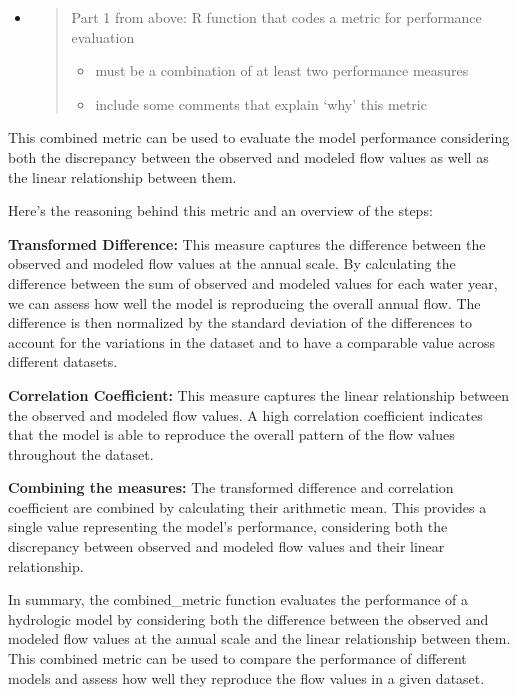 \documentclass[
  letterpaper,
  DIV=11,
  numbers=noendperiod]{scrartcl}
\begin{document}
\begin{itemize}
\item
  \begin{quote}
  Part 1 from above: R function that codes a metric for performance
  evaluation

  \begin{itemize}
  \item
    must be a combination of at least two performance measures
  \item
    include some comments that explain `why' this metric
  \end{itemize}
  \end{quote}
\end{itemize}

This combined metric can be used to evaluate the model performance
considering both the discrepancy between the observed and modeled flow
values as well as the linear relationship between them.

Here's the reasoning behind this metric and an overview of the steps:

\textbf{Transformed Difference:} This measure captures the difference
between the observed and modeled flow values at the annual scale. By
calculating the difference between the sum of observed and modeled
values for each water year, we can assess how well the model is
reproducing the overall annual flow. The difference is then normalized
by the standard deviation of the differences to account for the
variations in the dataset and to have a comparable value across
different datasets.

\textbf{Correlation Coefficient:} This measure captures the linear
relationship between the observed and modeled flow values. A high
correlation coefficient indicates that the model is able to reproduce
the overall pattern of the flow values throughout the dataset.

\textbf{Combining the measures:} The transformed difference and
correlation coefficient are combined by calculating their arithmetic
mean. This provides a single value representing the model's performance,
considering both the discrepancy between observed and modeled flow
values and their linear relationship.

In summary, the combined\_metric function evaluates the performance of a
hydrologic model by considering both the difference between the observed
and modeled flow values at the annual scale and the linear relationship
between them. This combined metric can be used to compare the
performance of different models and assess how well they reproduce the
flow values in a given dataset.
\end{document}
